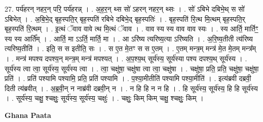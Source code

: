 \documentclass[17pt]{extarticle}
\begin{document}
27. पर्य॑हरन् नहर॒न् परि॒ पर्य॑हरन्न् । . अ॒ह॒र॒न् थ्स सो॑ ऽहरन् नहर॒न् थ्सः । . सो॑ ऽबिभे दबिभे॒थ् स सो॑ ऽबिभेत् । . अ॒बि॒भे॒द् बृह॒स्पति॒र् बृह॒स्पति॑ रबिभे दबिभे॒द् बृह॒स्पतिः॑ । . बृह॒स्पति॑ रि॒त्थ मि॒त्थम् बृह॒स्पति॒र् बृह॒स्पति॑ रि॒त्थम् । . इ॒त्थं ॅवाव वावे त्थ मि॒त्थं ॅवाव । . वाव स्य स्य वाव वाव स्यः । . स्य आर्ति॒ मार्तिꣳ॒॒ स्य स्य आर्ति᳚म् । . आर्ति॒ मा ऽऽर्ति॒ मार्ति॒ मा । . आ ऽरि॑ष्य त्यरिष्य॒त्या ऽरि॑ष्यति । . अ॒रि॒ष्य॒तीती त्य॑रिष्य त्यरिष्य॒तीति॑ । . इति॒ स स इतीति॒ सः । . स ए॒त मे॒तꣳ स स ए॒तम् । . ए॒तम् मन्त्र॒म् मन्त्र॑ मे॒त मे॒तम् मन्त्र᳚म् । . मन्त्र॑ मपश्य दपश्य॒न् मन्त्र॒म् मन्त्र॑ मपश्यत् । . अ॒प॒श्य॒थ् सूर्य॑स्य॒ सूर्य॑स्या पश्य दपश्य॒थ् सूर्य॑स्य । . सूर्य॑स्य त्वा त्वा॒ सूर्य॑स्य॒ सूर्य॑स्य त्वा । . त्वा॒ चक्षु॑षा॒ चक्षु॑षा त्वा त्वा॒ चक्षु॑षा । . चक्षु॑षा॒ प्रति॒ प्रति॒ चक्षु॑षा॒ चक्षु॑षा॒ प्रति॑ । . प्रति॑ पश्यामि पश्यामि॒ प्रति॒ प्रति॑ पश्यामि । . प॒श्या॒मीतीति॑ पश्यामि पश्या॒मीति॑ । . इत्य॑ब्रवी दब्रवी॒ दिती त्य॑ब्रवीत् । . अ॒ब्र॒वी॒न् न नाब्र॑वी दब्रवी॒न् न । . न हि हि न न हि । . हि सूर्य॑स्य॒ सूर्य॑स्य॒ हि हि सूर्य॑स्य । . सूर्य॑स्य॒ चक्षु॒ श्चक्षुः॒ सूर्य॑स्य॒ सूर्य॑स्य॒ चक्षुः॑ । . चक्षुः॒ किम् किम् चक्षु॒ श्चक्षुः॒ किम् । \newline

\textbf{Ghana Paata } \newline
\end{document}
